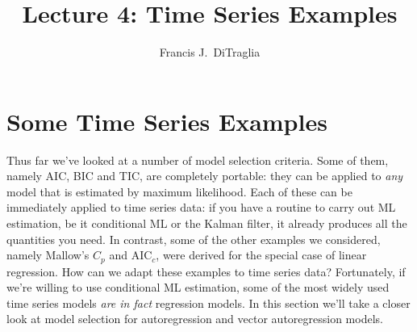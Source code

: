 \documentclass[12pt]{article}
\theoremstyle{definition}
\begin{document}
\title{Lecture 4: Time Series Examples}

\author{Francis J.\ DiTraglia}

\maketitle 


\section{Some Time Series Examples}
Thus far we've looked at a number of model selection criteria. Some of them, namely AIC, BIC and TIC, are completely portable: they can be applied to \emph{any} model that is estimated by maximum likelihood. Each of these can be immediately applied to time series data: if you have a routine to carry out ML estimation, be it conditional ML or the Kalman filter, it already produces all the quantities you need. In contrast, some of the other examples we considered, namely Mallow's $C_p$ and AIC$_c$, were derived for the special case of linear regression. How can we adapt these examples to time series data? Fortunately, if we're willing to use conditional ML estimation, some of the most widely used time series models \emph{are in fact} regression models. In this section we'll take a closer look at model selection for autoregression and vector autoregression models.
\end{document}
